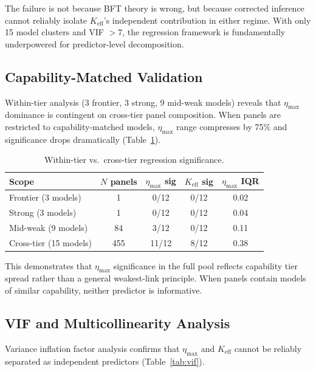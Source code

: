 \documentclass[11pt]{article}
\begin{document}
The failure is not because BFT theory is wrong, but because corrected inference cannot reliably isolate $K_{\text{eff}}$'s independent contribution in either regime. With only 15 model clusters and VIF $> 7$, the regression framework is fundamentally underpowered for predictor-level decomposition.

\subsection{Capability-Matched Validation}
\label{sec:capability}

Within-tier analysis (3 frontier, 3 strong, 9 mid-weak models) reveals that $\eta_{\max}$ dominance is contingent on cross-tier panel composition. When panels are restricted to capability-matched models, $\eta_{\max}$ range compresses by 75\% and significance drops dramatically (Table~\ref{tab:within_tier}).

\begin{table}[h]
\centering
\caption{Within-tier vs.\ cross-tier regression significance.}
\label{tab:within_tier}
\small
\begin{tabular}{lcccc}
\toprule
Scope & $N$ panels & $\eta_{\max}$ sig & $K_{\text{eff}}$ sig & $\eta_{\max}$ IQR \\
\midrule
Frontier (3 models) & 1 & 0/12 & 0/12 & 0.02 \\
Strong (3 models) & 1 & 0/12 & 0/12 & 0.04 \\
Mid-weak (9 models) & 84 & 3/12 & 0/12 & 0.11 \\
Cross-tier (15 models) & 455 & 11/12 & 8/12 & 0.38 \\
\bottomrule
\end{tabular}
\end{table}

This demonstrates that $\eta_{\max}$ significance in the full pool reflects capability tier spread rather than a general weakest-link principle. When panels contain models of similar capability, neither predictor is informative.

\subsection{VIF and Multicollinearity Analysis}
\label{sec:vif}

Variance inflation factor analysis confirms that $\eta_{\max}$ and $K_{\text{eff}}$ cannot be reliably separated as independent predictors (Table~\ref{tab:vif}).
\end{document}
